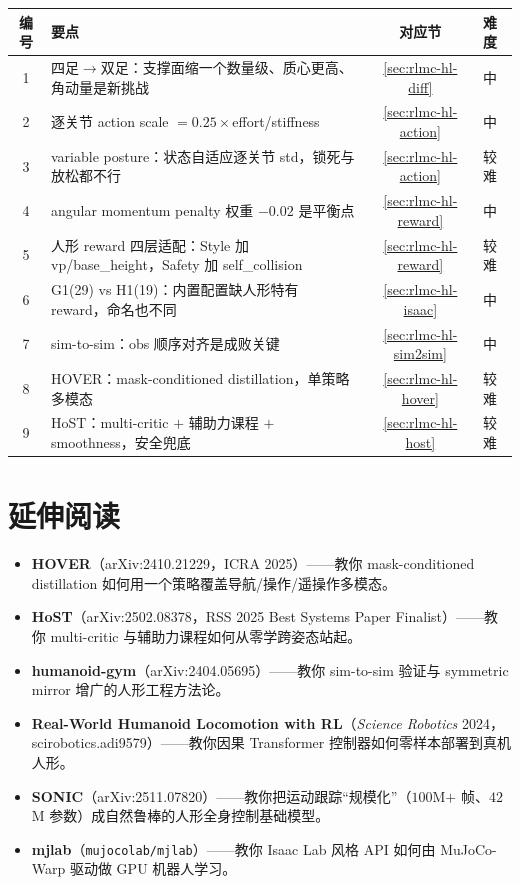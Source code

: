 \begin{center}
\small
\begin{tabular}{clcl}
\hline
编号 & 要点 & 对应节 & 难度 \\
\hline
1 & 四足$\to$双足：支撑面缩一个数量级、质心更高、角动量是新挑战 & \cref{sec:rlmc-hl-diff} & 中 \\
2 & 逐关节 action scale $=0.25\times$effort/stiffness & \cref{sec:rlmc-hl-action} & 中 \\
3 & variable posture：状态自适应逐关节 std，锁死与放松都不行 & \cref{sec:rlmc-hl-action} & 较难 \\
4 & angular momentum penalty 权重 $-0.02$ 是平衡点 & \cref{sec:rlmc-hl-reward} & 中 \\
5 & 人形 reward 四层适配：Style 加 vp/base\_height，Safety 加 self\_collision & \cref{sec:rlmc-hl-reward} & 较难 \\
6 & G1(29) vs H1(19)：内置配置缺人形特有 reward，命名也不同 & \cref{sec:rlmc-hl-isaac} & 中 \\
7 & sim-to-sim：obs 顺序对齐是成败关键 & \cref{sec:rlmc-hl-sim2sim} & 中 \\
8 & HOVER：mask-conditioned distillation，单策略多模态 & \cref{sec:rlmc-hl-hover} & 较难 \\
9 & HoST：multi-critic $+$ 辅助力课程 $+$ smoothness，安全兜底 & \cref{sec:rlmc-hl-host} & 较难 \\
\hline
\end{tabular}
\end{center}

\section*{延伸阅读}

\begin{itemize}
  \item \textbf{HOVER}（arXiv:2410.21229，ICRA 2025）\cite{he2025hover}——教你 mask-conditioned distillation 如何用一个策略覆盖导航/操作/遥操作多模态。
  \item \textbf{HoST}（arXiv:2502.08378，RSS 2025 Best Systems Paper Finalist）\cite{huang2025host}——教你 multi-critic 与辅助力课程如何从零学跨姿态站起。
  \item \textbf{humanoid-gym}（arXiv:2404.05695）\cite{gu2024humanoidgym}——教你 sim-to-sim 验证与 symmetric mirror 增广的人形工程方法论。
  \item \textbf{Real-World Humanoid Locomotion with RL}（\emph{Science Robotics} 2024，scirobotics.adi9579）\cite{radosavovic2024humanoid}——教你因果 Transformer 控制器如何零样本部署到真机人形。
  \item \textbf{SONIC}（arXiv:2511.07820）\cite{luo2025sonic}——教你把运动跟踪“规模化”（$100$M$+$ 帧、$42$M 参数）成自然鲁棒的人形全身控制基础模型。
  \item \textbf{mjlab}（\texttt{mujocolab/mjlab}）\cite{mjlab2026}——教你 Isaac Lab 风格 API 如何由 MuJoCo-Warp 驱动做 GPU 机器人学习。
\end{itemize}


